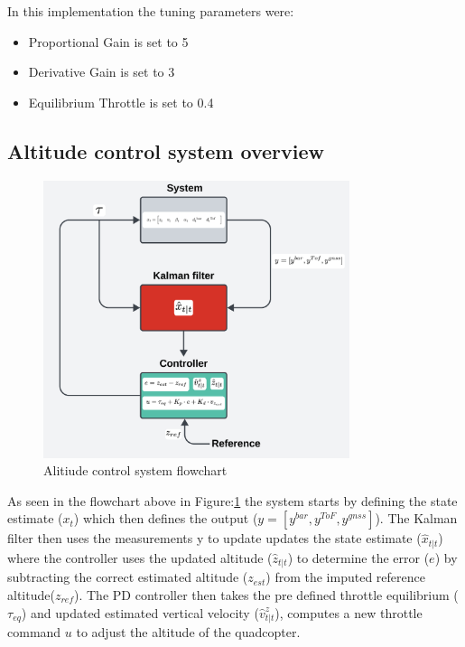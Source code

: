 \documentclass{report}
\begin{document}
In this implementation the tuning parameters were: 
\begin{itemize}
  \item Proportional Gain is set to 5 
  \item Derivative Gain is set to 3 
  \item Equilibrium Throttle is set to 0.4
\end{itemize}

\subsection{Altitude control system overview}
\begin{figure}[H]
  \centering
  \includegraphics[width=0.8\textwidth]{Pictures/PD_controller_flowchart.png}
  \caption{Alitiude control system flowchart}
  \label{fig:PD_controller_flowchart}
\end{figure}

As seen in the flowchart above in Figure:\ref{fig:PD_controller_flowchart} the system starts by defining the state estimate (\(x_t\)) which then defines the output (\(y = [y^{bar}, y^{ToF}, y^{gnss}]\)). The Kalman filter then uses the measurements y to update updates the state estimate (\(\hat{x}_{t|t}\)) where the controller uses the updated altitude (\(\hat{z}_{t|t}\)) to determine the error (\(e\)) by subtracting the correct estimated altitude (\(z_{est}\)) from the imputed reference altitude(\(z_{ref}\)). The PD controller then takes the pre defined throttle equilibrium (\(\tau_{eq}\)) and updated estimated vertical velocity (\(\hat{v}^z_{t|t}\)), computes a new throttle command \(u\) to adjust the altitude of the quadcopter.
\end{document}
